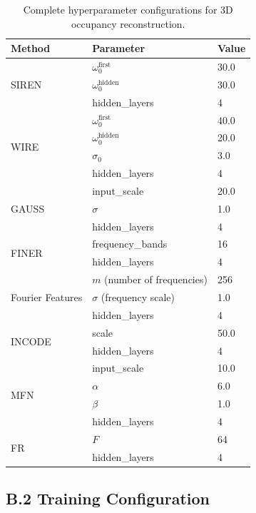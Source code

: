 \begin{table}[htbp]
\centering
\caption{Complete hyperparameter configurations for 3D occupancy reconstruction.}
\label{tab:full_hyperparams}
\begin{tabular}{llp{6cm}}
\toprule
\textbf{Method} & \textbf{Parameter} & \textbf{Value} \\
\midrule
\multirow{3}{*}{SIREN}
    & $\omega_0^{\text{first}}$ & 30.0 \\
    & $\omega_0^{\text{hidden}}$ & 30.0 \\
    & hidden\_layers & 4 \\
\midrule
\multirow{4}{*}{WIRE}
    & $\omega_0^{\text{first}}$ & 40.0 \\
    & $\omega_0^{\text{hidden}}$ & 20.0 \\
    & $\sigma_0$ & 3.0 \\
    & hidden\_layers & 4 \\
\midrule
\multirow{3}{*}{GAUSS}
    & input\_scale & 20.0 \\
    & $\sigma$ & 1.0 \\
    & hidden\_layers & 4 \\
\midrule
\multirow{2}{*}{FINER}
    & frequency\_bands & 16 \\
    & hidden\_layers & 4 \\
\midrule
\multirow{3}{*}{Fourier Features}
    & $m$ (number of frequencies) & 256 \\
    & $\sigma$ (frequency scale) & 1.0 \\
    & hidden\_layers & 4 \\
\midrule
\multirow{2}{*}{INCODE}
    & scale & 50.0 \\
    & hidden\_layers & 4 \\
\midrule
\multirow{4}{*}{MFN}
    & input\_scale & 10.0 \\
    & $\alpha$ & 6.0 \\
    & $\beta$ & 1.0 \\
    & hidden\_layers & 4 \\
\midrule
\multirow{2}{*}{FR}
    & $F$ & 64 \\
    & hidden\_layers & 4 \\
\bottomrule
\end{tabular}
\end{table}

\subsection*{B.2 Training Configuration}


